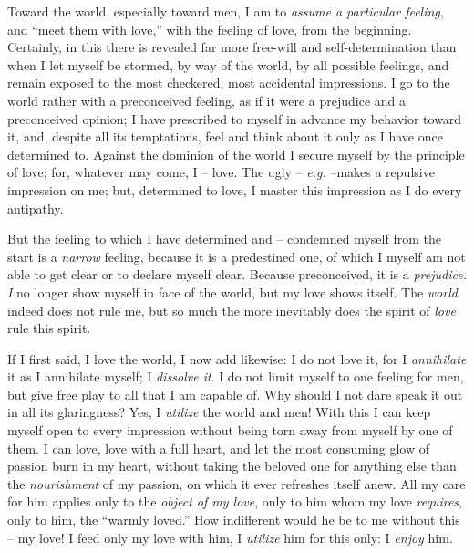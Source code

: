 \documentclass[12pt,a4paper]{book}
\begin{document}
Toward the world, especially toward men, I am to \textit{assume a particular 
feeling}, and ``meet them with love,'' with the feeling of love, from the 
beginning. Certainly, in this there is revealed far more free-will and 
self-determination than when I let myself be stormed, by way of the world, by 
all possible feelings, and remain exposed to the most checkered, most 
accidental impressions. I go to the world rather with a preconceived feeling, 
as if it were a prejudice and a preconceived opinion; I have prescribed to 
myself in advance my behavior toward it, and, despite all its temptations, 
feel and think about it only as I have once determined to. Against the 
dominion of the world I secure myself by the principle of love; for, whatever 
may come, I -- love. The ugly -- \textit{e.g.} --makes a repulsive impression 
on me; but, determined to love, I master this impression as I do every 
antipathy.

But the feeling to which I have determined and -- condemned myself from the 
start is a \textit{narrow} feeling, because it is a predestined one, of which 
I myself am not able to get clear or to declare myself clear. Because 
preconceived, it is a \textit{prejudice. I} no longer show myself in face of 
the world, but my love shows itself. The \textit{world} indeed does not rule 
me, but so much the more inevitably does the spirit of \textit{love} rule this 
spirit.

If I first said, I love the world, I now add likewise: I do not love it, for I 
\textit{annihilate} it as I annihilate myself; I \textit{dissolve it}. I do 
not limit myself to one feeling for men, but give free play to all that I am 
capable of. Why should I not dare speak it out in all its glaringness? Yes, I 
\textit{utilize} the world and men! With this I can keep myself open to every 
impression without being torn away from myself by one of them. I can love, 
love with a full heart, and let the most consuming glow of passion burn in my 
heart, without taking the beloved one for anything else than the 
\textit{nourishment} of my passion, on which it ever refreshes itself anew. 
All my care for him applies only to the \textit{object of my love}, only to 
him whom my love \textit{requires}, only to him, the ``warmly loved.'' How 
indifferent would he be to me without this -- my love! I feed only my love 
with him, I \textit{utilize} him for this only: I \textit{enjoy} him.
\end{document}
